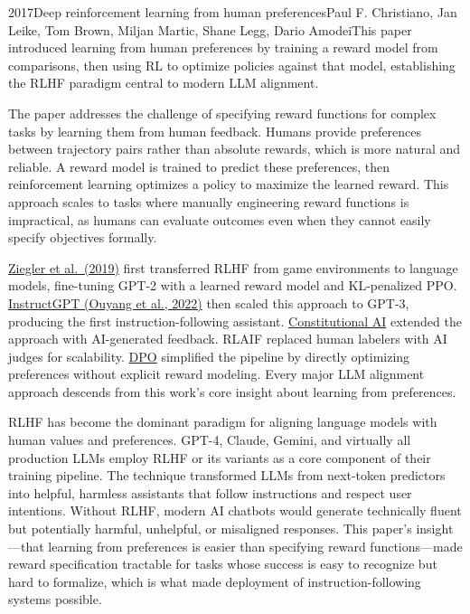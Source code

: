 
\begin{papersummary}{2017}{Deep reinforcement learning from human preferences}{Paul F. Christiano, Jan Leike, Tom Brown, Miljan Martic, Shane Legg, Dario Amodei}{This paper introduced learning from human preferences by training a reward model from comparisons, then using RL to optimize policies against that model, establishing the RLHF paradigm central to modern LLM alignment.}

The paper addresses the challenge of specifying reward functions for complex tasks by learning them from human feedback. Humans provide preferences between trajectory pairs rather than absolute rewards, which is more natural and reliable. A reward model is trained to predict these preferences, then reinforcement learning optimizes a policy to maximize the learned reward. This approach scales to tasks where manually engineering reward functions is impractical, as humans can evaluate outcomes even when they cannot easily specify objectives formally.

\hyperref[paper:ziegler-2019]{Ziegler et al.\ (2019)} first transferred RLHF from game environments to language models, fine-tuning GPT-2 with a learned reward model and KL-penalized PPO. \hyperref[paper:ouyang-2022]{InstructGPT (Ouyang et al., 2022)} then scaled this approach to GPT-3, producing the first instruction-following assistant. \hyperref[paper:bai-2022]{Constitutional AI} extended the approach with AI-generated feedback. RLAIF replaced human labelers with AI judges for scalability. \hyperref[paper:rafailov-2023-dpo]{DPO} simplified the pipeline by directly optimizing preferences without explicit reward modeling. Every major LLM alignment approach descends from this work's core insight about learning from preferences.

RLHF has become the dominant paradigm for aligning language models with human values and preferences. GPT-4, Claude, Gemini, and virtually all production LLMs employ RLHF or its variants as a core component of their training pipeline. The technique transformed LLMs from next-token predictors into helpful, harmless assistants that follow instructions and respect user intentions. Without RLHF, modern AI chatbots would generate technically fluent but potentially harmful, unhelpful, or misaligned responses. This paper's insight—that learning from preferences is easier than specifying reward functions—made reward specification tractable for tasks whose success is easy to recognize but hard to formalize, which is what made deployment of instruction-following systems possible.

\end{papersummary}
